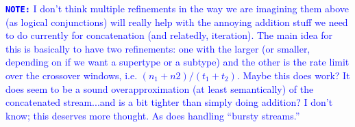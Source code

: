 \documentclass[acmsmall,nonacm,screen]{acmart}
\newcommand{\note}[1]{\textcolor{blue}{\textbf{\texttt{NOTE:}} {#1}}}
\begin{document}
\note{I don't think multiple refinements in the way we are imagining them above (as logical conjunctions) will really help with the annoying addition stuff we need to do currently for concatenation (and relatedly, iteration). The main idea for this is basically to have two refinements: one with the larger (or smaller, depending on if we want a supertype or a subtype) and the other is the rate limit over the crossover windows, i.e. $(n_1 + n2)/(t_1 + t_2)$. Maybe this does work? It does seem to be a sound overapproximation (at least semantically) of the concatenated stream...and is a bit tighter than simply doing addition? I don't know; this deserves more thought. As does handling ``bursty streams.''}



\end{document}
